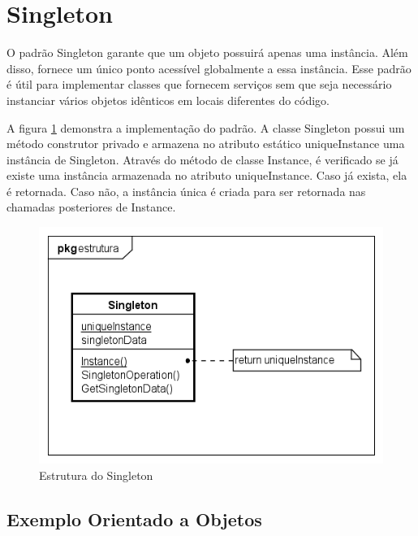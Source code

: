\section{Singleton}

O padrão Singleton garante que um objeto possuirá apenas uma 
instância. Além disso, fornece um único ponto acessível 
globalmente a essa instância. Esse padrão é útil 
para implementar classes que fornecem serviços sem que seja 
necessário instanciar vários objetos idênticos em 
locais diferentes do código.

A figura \ref{singleton_struct} demonstra a implementação 
do padrão. A classe Singleton possui um método construtor 
privado e armazena no atributo estático uniqueInstance uma 
instância de Singleton. Através do método de classe 
Instance, é verificado se já existe uma instância 
armazenada no atributo uniqueInstance. Caso já exista, 
ela é retornada. Caso não, a instância única é criada 
para ser retornada nas chamadas posteriores de Instance.

\begin{figure}[htb]
	\caption{\label{singleton_struct}Estrutura do Singleton}
	\begin{center}
	    \includegraphics[scale=0.6]{5_padroes-contexto-funcional/5.1_criacionais/5.1.5_singleton/singleton_estrutura.png}
	\end{center}
\end{figure}

\subsection*{Exemplo Orientado a Objetos}

